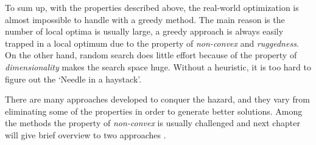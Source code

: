 To sum up, with the properties described above, the real-world optimization is almost impossible to handle with a greedy method.
The main reason is the number of local optima is usually large, a greedy approach is always easily trapped in a local optimum due to the property of \emph{non-convex} and \emph{ruggedness}.
On the other hand, random search does little effort because of the property of \emph{dimensionality} makes the search space huge.
Without a heuristic, it is too hard to figure out the `Needle in a haystack'.

There are many approaches developed to conquer the hazard, and they vary from eliminating some of the properties in order to generate better solutions. Among the methods the property of \emph{non-convex} is usually challenged and next chapter will give brief overview to two approaches .